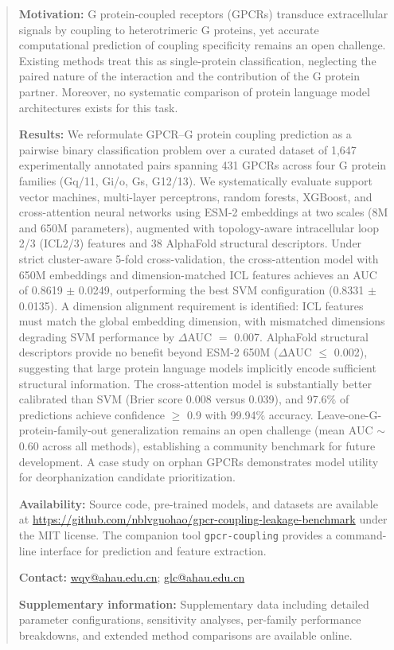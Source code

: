 \documentclass[11pt,a4paper]{article}
\begin{document}
\begin{abstract}

\textbf{Motivation:} G protein-coupled receptors (GPCRs) transduce extracellular signals by coupling to heterotrimeric G proteins, yet accurate computational prediction of coupling specificity remains an open challenge. Existing methods treat this as single-protein classification, neglecting the paired nature of the interaction and the contribution of the G protein partner. Moreover, no systematic comparison of protein language model architectures exists for this task.

\textbf{Results:} We reformulate GPCR--G protein coupling prediction as a pairwise binary classification problem over a curated dataset of 1,647 experimentally annotated pairs spanning 431 GPCRs across four G protein families (Gq/11, Gi/o, Gs, G12/13). We systematically evaluate support vector machines, multi-layer perceptrons, random forests, XGBoost, and cross-attention neural networks using ESM-2 embeddings at two scales (8M and 650M parameters), augmented with topology-aware intracellular loop 2/3 (ICL2/3) features and 38 AlphaFold structural descriptors. Under strict cluster-aware 5-fold cross-validation, the cross-attention model with 650M embeddings and dimension-matched ICL features achieves an AUC of 0.8619 $\pm$ 0.0249, outperforming the best SVM configuration (0.8331 $\pm$ 0.0135). A dimension alignment requirement is identified: ICL features must match the global embedding dimension, with mismatched dimensions degrading SVM performance by $\Delta$AUC $=$ 0.007. AlphaFold structural descriptors provide no benefit beyond ESM-2 650M ($\Delta$AUC $\le$ 0.002), suggesting that large protein language models implicitly encode sufficient structural information. The cross-attention model is substantially better calibrated than SVM (Brier score 0.008 versus 0.039), and 97.6\% of predictions achieve confidence $\ge$ 0.9 with 99.94\% accuracy. Leave-one-G-protein-family-out generalization remains an open challenge (mean AUC $\sim$0.60 across all methods), establishing a community benchmark for future development. A case study on orphan GPCRs demonstrates model utility for deorphanization candidate prioritization.

\textbf{Availability:} Source code, pre-trained models, and datasets are available at \url{https://github.com/nblvguohao/gpcr-coupling-leakage-benchmark} under the MIT license. The companion tool \texttt{gpcr-coupling} provides a command-line interface for prediction and feature extraction.

\textbf{Contact:} \href{mailto:wqy@ahau.edu.cn}{wqy@ahau.edu.cn}; \href{mailto:glc@ahau.edu.cn}{glc@ahau.edu.cn}

\textbf{Supplementary information:} Supplementary data including detailed parameter configurations, sensitivity analyses, per-family performance breakdowns, and extended method comparisons are available online.

\end{abstract}
\end{document}
